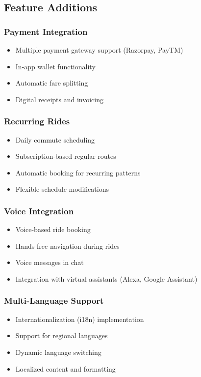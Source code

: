 \documentclass[12pt,a4paper]{article}
\begin{document}
\subsection{Feature Additions}

\subsubsection{Payment Integration}
\begin{itemize}
    \item Multiple payment gateway support (Razorpay, PayTM)
    \item In-app wallet functionality
    \item Automatic fare splitting
    \item Digital receipts and invoicing
\end{itemize}

\subsubsection{Recurring Rides}
\begin{itemize}
    \item Daily commute scheduling
    \item Subscription-based regular routes
    \item Automatic booking for recurring patterns
    \item Flexible schedule modifications
\end{itemize}

\subsubsection{Voice Integration}
\begin{itemize}
    \item Voice-based ride booking
    \item Hands-free navigation during rides
    \item Voice messages in chat
    \item Integration with virtual assistants (Alexa, Google Assistant)
\end{itemize}

\subsubsection{Multi-Language Support}
\begin{itemize}
    \item Internationalization (i18n) implementation
    \item Support for regional languages
    \item Dynamic language switching
    \item Localized content and formatting
\end{itemize}
\end{document}
